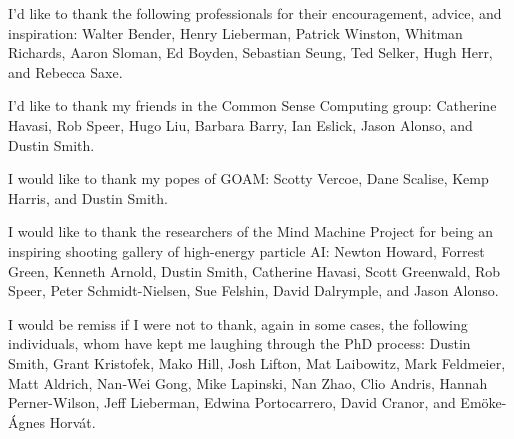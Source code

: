 \vspace{5mm}

\noindent I'd like to thank the following professionals for their encouragement, advice, and inspiration:
Walter Bender,
Henry Lieberman,
Patrick Winston,
Whitman Richards,
Aaron Sloman,
Ed Boyden,
Sebastian Seung,
Ted Selker,
Hugh Herr, and
Rebecca Saxe.

\vspace{5mm}

\noindent I'd like to thank my friends in the Common Sense Computing group:
Catherine Havasi,
Rob Speer,
Hugo Liu,
Barbara Barry,
Ian Eslick,
Jason Alonso, and
Dustin Smith.

\vspace{5mm}

\noindent I would like to thank my popes of GOAM:
Scotty Vercoe,
Dane Scalise,
Kemp Harris, and
Dustin Smith.

\vspace{5mm}

\noindent I would like to thank the researchers of the Mind Machine Project for being an inspiring shooting gallery of high-energy particle AI:
Newton Howard, Forrest Green, Kenneth Arnold, Dustin Smith, Catherine Havasi, Scott Greenwald, Rob Speer, Peter Schmidt-Nielsen, Sue Felshin, David Dalrymple, and Jason Alonso.

\vspace{5mm}

\noindent I would be remiss if I were not to thank, again in some cases, the following individuals,
whom have kept me laughing through the PhD process:
Dustin Smith, %
Grant Kristofek, %
Mako Hill, %
Josh Lifton, %
Mat Laibowitz, %
Mark Feldmeier, %
Matt Aldrich, %
Nan-Wei Gong, %
Mike Lapinski, %
Nan Zhao, %
Clio Andris, %
Hannah Perner-Wilson, %
Jeff Lieberman, %
Edwina Portocarrero, %
David Cranor, and %
Em\"{o}ke-\'{A}gnes Horv\'{a}t. %

\endgroup

